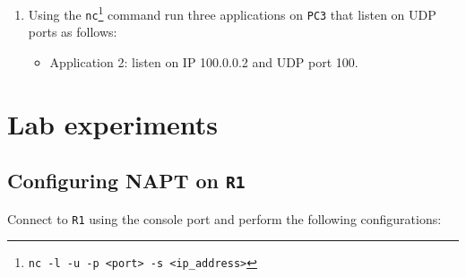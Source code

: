 \documentclass[pdftex,12pt,a4paper]{article}
\begin{document}
\begin{enumerate}
           \item Using the \texttt{nc}\footnote{\texttt{nc -l -u -p <port> -s
               <ip\_address>}} command run three applications on \texttt{PC3} that
               listen on UDP ports as follows:
                \begin{itemize}
                    \item Application 2: listen on IP 100.0.0.2 and UDP port 100.
                \end{itemize}
        \end{enumerate}

    \section{Lab experiments}
        \subsection{Configuring NAPT on \texttt{R1}}
            Connect to \texttt{R1} using the console port and perform the
            following configurations:
\end{document}
